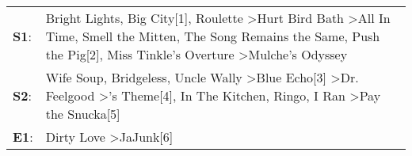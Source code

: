 \begin{supertabular}{p{0.03\textwidth}p{0.92\textwidth}}
 \textbf{S1}:  &  Bright Lights, Big City[1]\textsuperscript{}, \enspace Roulette\textsuperscript{} \textgreater \enspace Hurt Bird Bath\textsuperscript{} \textgreater \enspace All In Time\textsuperscript{}, \enspace Smell the Mitten\textsuperscript{}, \enspace The Song Remains the Same\textsuperscript{}, \enspace Push the Pig[2]\textsuperscript{}, \enspace Miss Tinkle's Overture\textsuperscript{} \textgreater \enspace Mulche's Odyssey\textsuperscript{}  \enspace  \\
 \textbf{S2}:  &      Wife Soup\textsuperscript{}, \enspace Bridgeless\textsuperscript{}, \enspace Uncle Wally\textsuperscript{} \textgreater \enspace Blue Echo[3]\textsuperscript{} \textgreater \enspace Dr. Feelgood\textsuperscript{} \textgreater {}'s Theme[4]\textsuperscript{}, \enspace In The Kitchen\textsuperscript{}, \enspace Ringo\textsuperscript{}, \enspace I Ran\textsuperscript{} \textgreater \enspace Pay the Snucka[5]\textsuperscript{}  \enspace  \\
 \textbf{E1}:  &                                                                                                                                                                                                                                                                                                                                                                           Dirty Love\textsuperscript{} \textgreater \enspace JaJunk[6]\textsuperscript{}  \enspace  \\
\end{supertabular}
